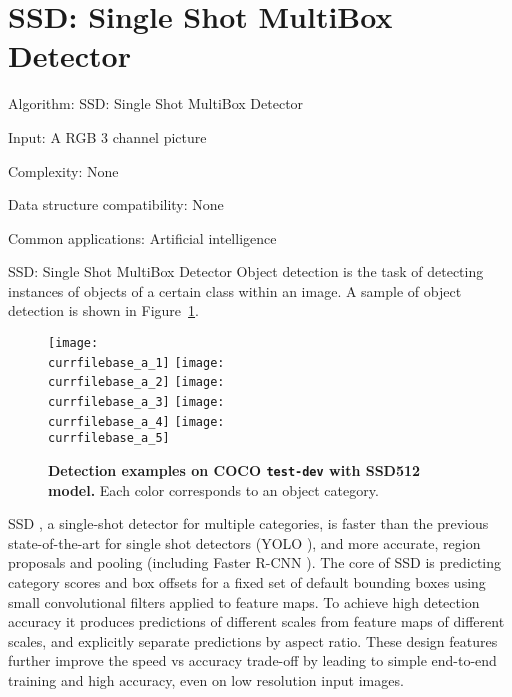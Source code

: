 \documentclass[catalog.tex]{subfiles}
\begin{document}
\def\pbname{SSD: Single Shot MultiBox Detector} %

\section{\pbname} 

\begin{overview}
\item [Algorithm:] SSD: Single Shot MultiBox Detector
\item [Input:] A RGB 3 channel picture
\item [Complexity:] None
\item [Data structure compatibility:] None
\item [Common applications:] Artificial intelligence
\end{overview}


\begin{problem}{\pbname}
Object detection is the task of detecting instances of objects of a certain class within an image. A sample of object detection is shown in Figure~\ref{fig:\currfilebase_a}.
\begin{figure}[!htb]
	\centering
	\texttt{[image: \\currfilebase\_a\_1]}
	\texttt{[image: \\currfilebase\_a\_2]}
	\texttt{[image: \\currfilebase\_a\_3]}
	\texttt{[image: \\currfilebase\_a\_4]}
	\texttt{[image: \\currfilebase\_a\_5]}\\
	\caption{\textbf{Detection examples on COCO \texttt{test-dev} with SSD512 model.} Each color corresponds to an object category.}
    \label{fig:\currfilebase_a}
\end{figure}

SSD \cite{liu2016ssd}, a single-shot detector for multiple categories, is faster than the previous state-of-the-art for single shot detectors (YOLO \cite{redmon2016you}), and more accurate, region proposals and pooling (including Faster R-CNN \cite{ren2015faster}).
The core of SSD is predicting category scores and box offsets for a fixed set of default bounding boxes using small convolutional filters applied to feature maps.
To achieve high detection accuracy it produces predictions of different scales from feature maps of different scales, and explicitly separate predictions by aspect ratio.
These design features further improve the speed vs accuracy trade-off by leading to simple end-to-end training and high accuracy, even on low resolution input images.
\end{problem}
\end{document}

